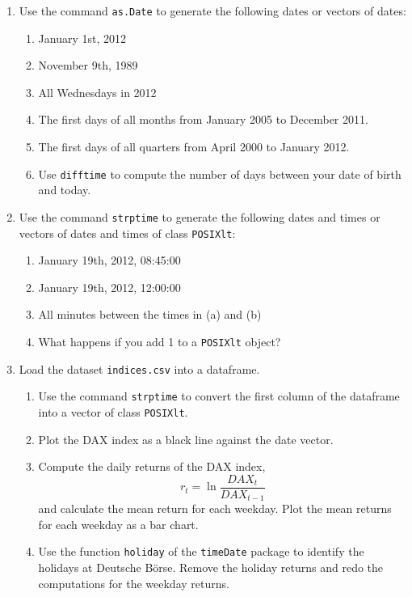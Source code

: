 \documentclass{article}
\begin{document}
\begin{enumerate}
\item Use the command \texttt{as.Date} to generate the following dates or
vectors of dates:

\begin{enumerate}
\item January 1st, 2012

\item November 9th, 1989

\item All Wednesdays in 2012

\item The first days of all months from January 2005 to December 2011.

\item The first days of all quarters from April 2000 to January 2012.

\item Use \texttt{difftime} to compute the number of days between your date of
birth and today.
\end{enumerate}

\item Use the command \texttt{strptime} to generate the following dates and
times or vectors of dates and times of class \texttt{POSIXlt}:

\begin{enumerate}
\item January 19th, 2012, 08:45:00

\item January 19th, 2012, 12:00:00

\item All minutes between the times in (a) and (b)

\item What happens if you add 1 to a \texttt{POSIXlt} object?
\end{enumerate}

\item Load the dataset \texttt{indices.csv} into a dataframe.

\begin{enumerate}
\item Use the command \texttt{strptime} to convert the first column of the
dataframe into a vector of class \texttt{POSIXlt}.

\item Plot the DAX index as a black line against the date vector.

\item Compute the daily returns of the DAX index,%
\begin{equation*}
r_{t}=\ln \frac{DAX_{t}}{DAX_{t-1}}
\end{equation*}%
and calculate the mean return for each weekday. Plot the mean
returns for each weekday as a bar chart.

\item Use the function \texttt{holiday} of the \texttt{timeDate} package to
identify the holidays at Deutsche B\"{o}rse. Remove the holiday returns and
redo the computations for the weekday returns.
\end{enumerate}
\end{enumerate}
\newpage
\end{document}
